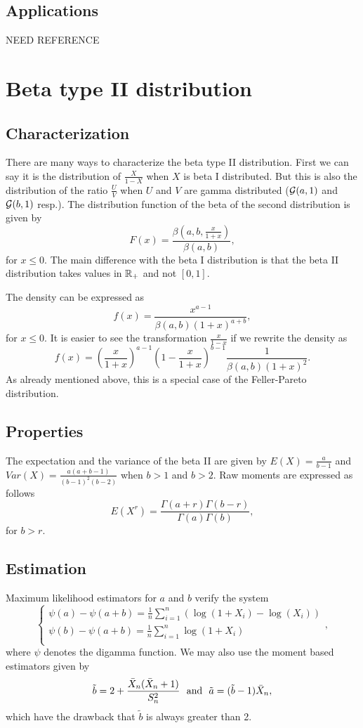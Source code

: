 \subsection{Applications}
NEED REFERENCE

\section{Beta type II distribution}
\subsection{Characterization}
There are many ways to characterize the beta type II distribution. First we can say it is the distribution of
$\frac{X}{1-X}$ when $X$ is beta I distributed. But this is also the distribution of the ratio $\frac{U}{V}$ when $U$ and $V$ are gamma distributed ($\mathcal G(a,1)$ and $\mathcal G(b,1)$ resp.).
The distribution function of the beta of the second distribution is given by
$$
F(x) = \frac{\beta(a,b,\frac{x}{1+x})}{\beta(a, b)},
$$
for $x\leq 0$. The main difference with the beta I distribution is that the beta II distribution takes values in $\mathbb R_+$ and not $[0,1]$.

The density can be expressed as
$$
f(x) = \frac{x^{a-1}}{\beta(a, b) (1+x)^{a + b}},
$$
for $x\leq 0$. It is easier to see the transformation $\frac{x}{1-x}$ if we rewrite the density as
$$
f(x) = \left(\frac{x}{1+x}\right)^{a-1}\left(1-\frac{x}{1+x}\right)^{b-1}\frac{1}{\beta(a,b)(1+x)^2}.
$$
As already mentioned above, this is a special case of the Feller-Pareto distribution.
\subsection{Properties}
The expectation and the variance of the beta II are given by $E(X) = \frac{a}{b-1}$ and $Var(X) = \frac{a(a+b-1)}{(b-1)^2(b-2)}$ when $b>1$ and $b>2$.
Raw moments are expressed as follows 
$$
E(X^r) =  \frac{\Gamma(a+r)
\Gamma(b-r)}{\Gamma(a)\Gamma(b)},
$$
for $b>r$.

\subsection{Estimation}
Maximum likelihood estimators for $a$ and $b$ verify the system
$$
\left\{
\begin{array}{l}
\psi(a)-\psi(a+b) = \frac{1}{n}\sum\limits_{i=1}^n(\log(1+X_i)-\log(X_i))\\
\psi(b)-\psi(a+b) = \frac{1}{n}\sum\limits_{i=1}^n\log(1+X_i)\\
\end{array}
\right. ,
$$
where $\psi$ denotes the digamma function. We may also use the moment based estimators given by
$$
\tilde b = 2 + \frac{\bar X_n(\bar X_n+1)}{S_n^2} \textrm{~~and~~} \tilde a=(\tilde b-1)\bar X_n,
$$
which have the drawback that $\tilde b$ is always greater than 2.


